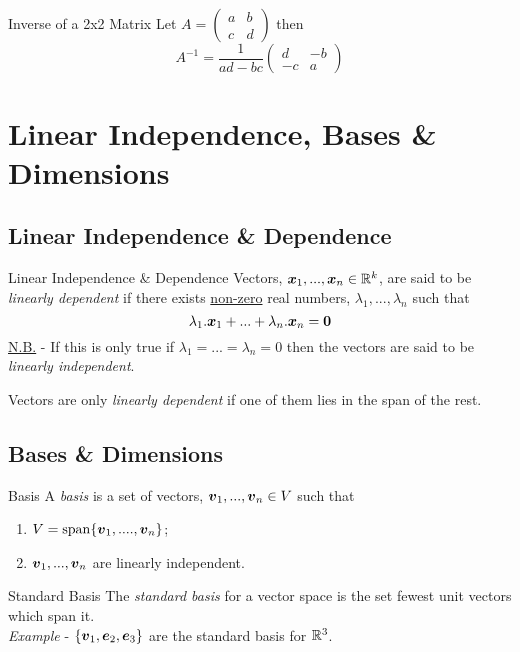\documentclass[11pt,a4paper]{article}
\begin{document}
\subtitle{Theorem 3.27 - }{Inverse of a 2x2 Matrix}
Let $A = \begin{pmatrix}
  a & b \\
  c & d
\end{pmatrix}$ then $$A^{-1} = \frac{1}{ad - bc}\begin{pmatrix}
  d & -b \\
  -c & a
\end{pmatrix}$$

\section{Linear Independence, Bases \& Dimensions}
\subsection{Linear Independence \& Dependence}
%
\subtitle{Definition 4.01 - }{Linear Independence \& Dependence}
Vectors, $\boldsymbol{x}_1, ... , \boldsymbol{x}_n \in \mathbb{R}^k$, are said to be \textit{linearly dependent} if there exists \underline{non-zero} real numbers, $\lambda_1, ... , \lambda_n$ such that
$$\lambda_1.\boldsymbol{x}_1 + ... + \lambda_n.\boldsymbol{x}_n = \boldsymbol{0}$$
\underline{N.B.} - If this is only true if $\lambda_1 = ... = \lambda_n = 0$ then the vectors are said to be \textit{linearly independent}. \\

\subtitle{Remark 4.02}{}
Vectors are only \textit{linearly dependent} if one of them lies in the span of the rest.

\subsection{Bases \& Dimensions}
%
\subtitle{Definition 4.03 - }{Basis}
A \textit{basis} is a set of vectors, $\boldsymbol{v}_1, ... , \boldsymbol{v}_n \in V$ such that
\begin{enumerate}[label=\roman*)]
  \item $V = \mathrm{span}\{\boldsymbol{v}_1, .... , \boldsymbol{v}_n\}$;
  \item $\boldsymbol{v}_1, ... , \boldsymbol{v}_n$ are linearly independent.
\end{enumerate}

\subtitle{Definition 4.04 - }{Standard Basis}
The \textit{standard basis} for a vector space is the set fewest unit vectors which span it. \\
\textit{Example} - $\{\boldsymbol{v}_1, \boldsymbol{e}_2 , \boldsymbol{e}_3\}$ are the standard basis for $\mathbb{R}^3$. \\
\end{document}

